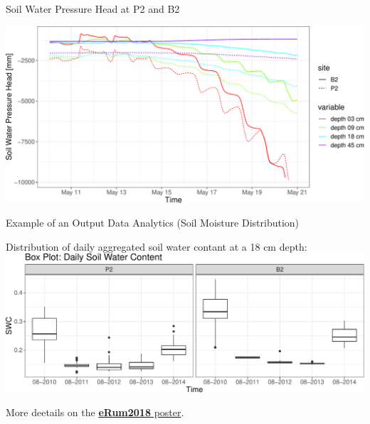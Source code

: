 \documentclass[ignorenonframetext,]{beamer}
\begin{document}
\begin{frame}{Soil Water Pressure Head at P2 and B2}

\includegraphics{presentation_files/figure-beamer/unnamed-chunk-11-1.pdf}

\end{frame}

\begin{frame}{Example of an Output Data Analytics (Soil Moisture
Distribution)}

Distribution of daily aggregated soil water contant at a 18 cm depth:
\includegraphics{presentation_files/figure-beamer/unnamed-chunk-12-1.pdf}

More deetails on the
\href{https://github.com/ecor/geotopbricks_doc/blob/master/erum2018_poster/erum2018_poster_cordano_et_al.png}{\textbf{eRum2018}
poster}.

\end{frame}
\end{document}
